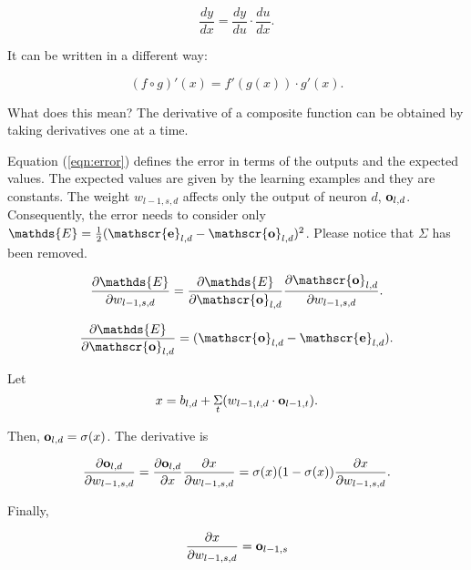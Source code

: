 \begin{equation}
\frac{dy}{dx} = \frac{dy}{du} \cdot \frac{du}{dx}.
\end{equation}

It can be written in a different way:

\begin{equation}
(f \circ g)'(x) = f'(g(x)) \cdot g'(x).
\end{equation}

What does this mean?  The derivative of a composite function can be
obtained by taking derivatives one at a time.

Equation (\ref{eqn:error}) defines the error in terms of the outputs
and the expected values.  The expected values are given by the
learning examples and they are constants.  The weight $w_{l-1, s, d}$
affects only the output of neuron $d$, $\mathscr {\bf o}_{l, d}$.
Consequently, the error needs to consider only $\mathds{E}
= \frac{1}{2} (\mathscr {\bf e}_{l, d} - \mathscr {\bf o}_{l,
d})^2$. Please notice that $\Sigma$ has been removed.

\begin{equation}
\frac{\partial \mathds{E}}{\partial w_{l-1, s, d}}
= \frac{\partial \mathds{E}} {\partial \mathscr{\bf o}_{l, d}} \frac{\partial
\mathscr{\bf o}_{l, d}}{\partial w_{l-1, s, d}}.
\label{eqn:partialEoutput}
\end{equation}

\begin{equation}
\frac{\partial \mathds{E}} {\partial \mathscr{\bf o}_{l, d}}
= (\mathscr{\bf o}_{l, d} -   \mathscr{\bf e} _{l, d}).
\end{equation}

Let
\begin{equation}
x = b_{l, d} + \underset{t}{\Sigma} (w_{l-1, t, d}
\cdot \mathscr{\bf o}_{l- 1, t}).
\label{eqn:definex}
\end{equation}

Then,
$\mathscr{\bf o}_{l, d} = \sigma(x)$.
The derivative is

\begin{equation}
\frac{\partial
\mathscr{\bf o}_{l, d}}{\partial w_{l-1, s, d}}
= \frac{\partial \mathscr{\bf o}_{l, d}} {\partial x}
 \frac{\partial x} {\partial w_{l-1, s, d}}
= \sigma(x) (1 - \sigma(x)) \frac{\partial x} {\partial w_{l-1, s, d}}.
\end{equation}

Finally, 

\begin{equation}
\frac{\partial x} {\partial w_{l-1, s, d}} =  \mathscr{\bf o}_{l-1, s}
\label{eqn:partialxwl1}
\end{equation}

